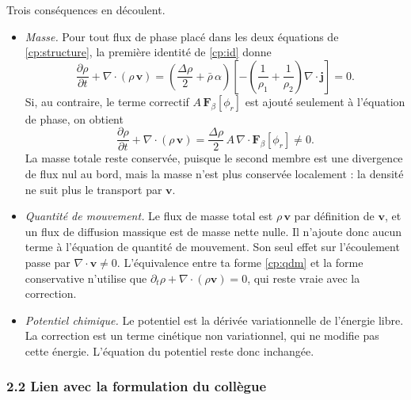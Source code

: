 Trois conséquences en découlent.
\begin{itemize}
  \item \emph{Masse.} Pour tout flux de phase placé dans les deux équations de \eqref{cp:structure}, la première identité de \eqref{cp:id} donne
  \begin{equation}
    \frac{\partial\rho}{\partial t} + \nabla\cdot\left(\rho\,\mathbf{v}\right)
    = \left(\frac{\Delta\rho}{2} + \bar{\rho}\,\alpha\right)
      \left[-\left(\frac{1}{\rho_1}+\frac{1}{\rho_2}\right)\nabla\cdot\mathbf{j}\right] = 0 .
  \end{equation}
  Si, au contraire, le terme correctif $A\,\mathbf{F}_\beta[\phi_r]$ est ajouté seulement à l'équation de phase, on obtient
  \begin{equation}\label{cp:masse-fausse}
    \frac{\partial\rho}{\partial t} + \nabla\cdot\left(\rho\,\mathbf{v}\right) = \frac{\Delta\rho}{2}\,A\,\nabla\cdot\mathbf{F}_\beta[\phi_r] \neq 0 .
  \end{equation}
  La masse totale reste conservée, puisque le second membre est une divergence de flux nul au bord, mais la masse n'est plus conservée localement : la densité ne suit plus le transport par $\mathbf{v}$.
  \item \emph{Quantité de mouvement.} Le flux de masse total est $\rho\,\mathbf{v}$ par définition de $\mathbf{v}$, et un flux de diffusion massique est de masse nette nulle. Il n'ajoute donc aucun terme à l'équation de quantité de mouvement. Son seul effet sur l'écoulement passe par $\nabla\cdot\mathbf{v}\neq 0$. L'équivalence entre ta forme \eqref{cp:qdm} et la forme conservative n'utilise que $\partial_t\rho+\nabla\cdot(\rho\mathbf{v})=0$, qui reste vraie avec la correction.
  \item \emph{Potentiel chimique.} Le potentiel est la dérivée variationnelle de l'énergie libre. La correction est un terme cinétique non variationnel, qui ne modifie pas cette énergie. L'équation du potentiel reste donc inchangée.
\end{itemize}

\subsubsection*{2.2 Lien avec la formulation du collègue}


